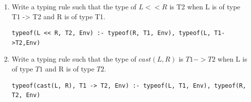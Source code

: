 \documentclass[a4paper]{exam}
\begin{document}
\begin{enumerate}
  \item Write a typing rule such that the type of $L << R$ is T2 when L is of type T1 -> T2 and R is of type T1.
  \begin{solution}
  \begin{verbatim}
typeof(L << R, T2, Env) :- typeof(R, T1, Env), typeof(L, T1->T2,Env)
\end{verbatim}
  \end{solution}
  \item Write a typing rule such that the type of $cast(L,R)$ is $T1 -> T2$ when L is of type $T1$ and R is of type $T2$.

        \begin{solution}
\begin{verbatim}
typeof(cast(L, R), T1 -> T2, Env) :- typeof(L, T1, Env), typeof(R, T2, Env)
\end{verbatim}
        \end{solution}

\end{enumerate}
\end{document}
